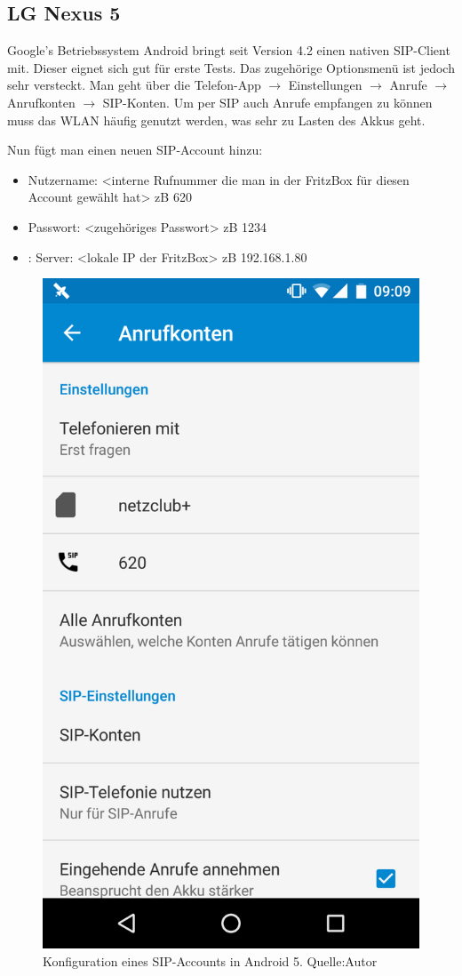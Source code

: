 \documentclass[a4paper,12pt]{scrbook}
\begin{document}
\subsection{LG Nexus 5}
Google's Betriebssystem Android bringt seit Version 4.2 einen nativen SIP-Client mit. Dieser eignet sich gut für erste Tests. Das zugehörige Optionsmenü ist jedoch sehr versteckt.
Man geht über die Telefon-App $\rightarrow$ Einstellungen $\rightarrow$ Anrufe $\rightarrow$ Anrufkonten $\rightarrow$ SIP-Konten. Um per SIP auch Anrufe empfangen zu können muss
das WLAN häufig genutzt werden, was sehr zu Lasten des Akkus geht.

Nun fügt man einen neuen SIP-Account hinzu:
\begin{itemize}
 \item Nutzername: <interne Rufnummer die man in der FritzBox für diesen Account gewählt hat> zB 620
 \item Passwort: <zugehöriges Passwort> zB 1234
 \item: Server: <lokale IP der FritzBox> zB 192.168.1.80
\end{itemize}

\begin{figure}[H]
\begin{center}
\includegraphics[width=.4\hsize]{./images/voip-client-nexus5.png}
\end{center}
\caption[Konfiguration eines SIP-Accounts in Android 5]
{\label{voip-client-nexus5}Konfiguration eines SIP-Accounts in Android 5. Quelle:Autor}
\end{figure}
\end{document}
